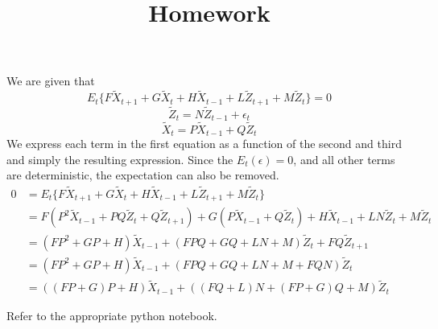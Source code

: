 \documentclass[12pt]{article}
\title{Homework}
\newenvironment{problem}[2][Problem]{\begin{trivlist}
\item[\hskip \labelsep {\bfseries #1}\hskip \labelsep {\bfseries #2}]}{\end{trivlist}}
\begin{document}
\begin{problem}{3.} 
We are given that 
$$E_t \big\{ F\tilde{X}_{t+1} +G\tilde{X}_{t} + H\tilde{X}_{t-1} + L\tilde{Z}_{t+1} + M\tilde{Z}_{t}\big\} = 0$$
$$\tilde{Z}_{t} = N \tilde{Z}_{t-1} + \epsilon_t$$
$$\tilde{X}_{t} = P \tilde{X}_{t-1} + Q\tilde{Z}_{t}$$
We express each term in the first equation as a function of the second and third and simply the resulting expression. Since the $E_t(\epsilon) = 0$, and all other terms are deterministic, the expectation can also be removed.
\begin{align*}
0 &= E_t \big\{ F\tilde{X}_{t+1} +G\tilde{X}_{t} + H\tilde{X}_{t-1} + L\tilde{Z}_{t+1} + M\tilde{Z}_{t}\big\} \\
& = F(P^2\tilde{X}_{t-1} + PQ\tilde{Z}_{t} + Q\tilde{Z}_{t+1}) + G( P \tilde{X}_{t-1} + Q\tilde{Z}_{t}) + H\tilde{X}_{t-1} + LN\tilde{Z}_{t} + M\tilde{Z}_{t}  \\
& = (FP^2+GP +H)\tilde{X}_{t-1} + (FPQ + GQ + LN + M)\tilde{Z}_{t} + FQ\tilde{Z}_{t+1}\\
 &= (FP^2+GP +H)\tilde{X}_{t-1} + (FPQ + GQ + LN + M + FQN)\tilde{Z}_{t}\\
&  = ((FP+G)P + H)\tilde{X}_{t-1} + ((FQ + L)N + (FP+G)Q +M)\tilde{Z}_{t}\
\end{align*}
\end{problem}

\begin{problem}{1 - 2, 4 - 11.} 
Refer to the appropriate python notebook.
\end{problem}
\end{document}
